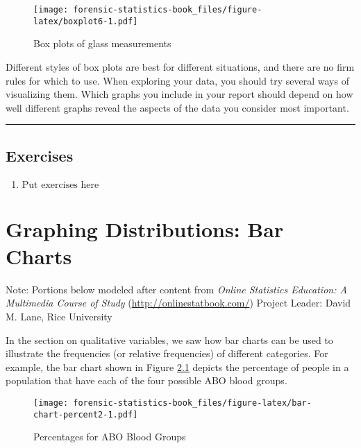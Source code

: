 \documentclass[
]{book}
\providecommand{\tightlist}{%
  \setlength{\itemsep}{0pt}\setlength{\parskip}{0pt}}
\begin{document}
\begin{figure}
\centering
\texttt{[image: forensic-statistics-book\_files/figure-latex/boxplot6-1.pdf]}
\caption{\label{fig:boxplot6}Box plots of glass measurements}
\end{figure}

Different styles of box plots are best for different situations, and there are
no firm rules for which to use. When exploring your data, you should try several
ways of visualizing them. Which graphs you include in your report should depend
on how well different graphs reveal the aspects of the data you consider most
important.

\begin{center}\rule{0.5\linewidth}{0.5pt}\end{center}

\hypertarget{exercises-4}{%
\section{Exercises}\label{exercises-4}}

\begin{enumerate}
\def\labelenumi{\arabic{enumi}.}
\tightlist
\item
  \(\text{Put exercises here}\)
\end{enumerate}

\hypertarget{graphing-distributions-bar-charts}{%
\chapter{Graphing Distributions: Bar Charts}\label{graphing-distributions-bar-charts}}

Note: Portions below modeled after content from
\emph{Online Statistics Education: A Multimedia Course of Study}
(\url{http://onlinestatbook.com/}) Project Leader: David M. Lane, Rice University

In the section on qualitative variables, we saw how bar charts can be used
to illustrate the frequencies (or relative frequencies) of different categories.
For example, the bar chart shown in Figure \ref{fig:bar-chart-percent2}
depicts the percentage of people in a population that have each of the four
possible ABO blood groups.

\begin{figure}
\centering
\texttt{[image: forensic-statistics-book\_files/figure-latex/bar-chart-percent2-1.pdf]}
\caption{\label{fig:bar-chart-percent2}Percentages for ABO Blood Groups}
\end{figure}
\end{document}
